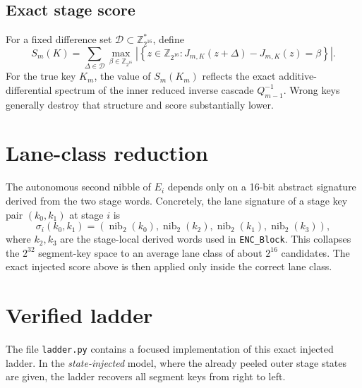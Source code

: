 \documentclass[11pt]{article}
\begin{document}
\subsection{Exact stage score}
For a fixed difference set $\mathcal{D}\subset \mathbb{Z}_{2^{16}}^\ast$, define
\[
S_m(K)=\sum_{\Delta\in\mathcal{D}}
\max_{\beta\in\mathbb{Z}_{2^{16}}}
\left|
\left\{z\in\mathbb{Z}_{2^{16}} :
J_{m,K}(z+\Delta)-J_{m,K}(z)=\beta
\right\}
\right|.
\]
For the true key $K_m$, the value of $S_m(K_m)$ reflects the exact additive-differential spectrum of the inner reduced inverse cascade $Q_{m-1}^{-1}$. Wrong keys generally destroy that structure and score substantially lower.

\section{Lane-class reduction}
The autonomous second nibble of $E_i$ depends only on a 16-bit abstract signature derived from the two stage words. Concretely, the lane signature of a stage key pair $(k_0,k_1)$ at stage $i$ is
\[
\sigma_i(k_0,k_1)=
(\operatorname{nib}_2(k_0),\operatorname{nib}_2(k_2),
\operatorname{nib}_2(k_1),\operatorname{nib}_2(k_3)),
\]
where $k_2,k_3$ are the stage-local derived words used in \texttt{ENC\_Block}. This collapses the $2^{32}$ segment-key space to an average lane class of about $2^{16}$ candidates. The exact injected score above is then applied only inside the correct lane class.

\section{Verified ladder}
The file \texttt{ladder.py} contains a focused implementation of this exact injected ladder. In the \emph{state-injected} model, where the already peeled outer stage states are given, the ladder recovers all segment keys from right to left.
\end{document}
